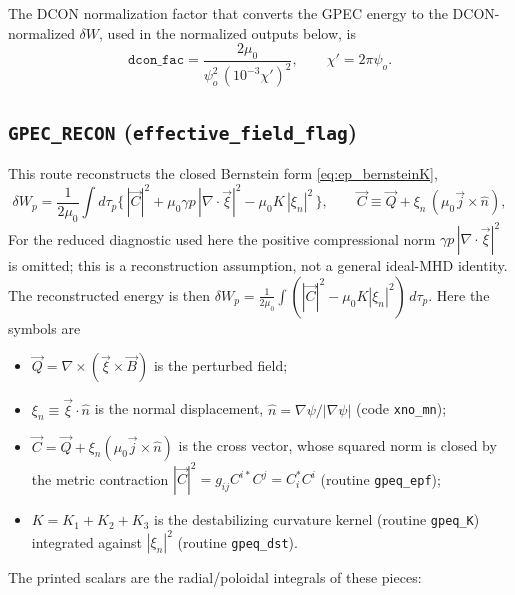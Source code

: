\documentclass[10pt,a4paper]{article}
\numberwithin{equation}{section}
\begin{document}
The DCON normalization factor that converts the GPEC energy to the
DCON-normalized $\delta W$, used in the normalized outputs below, is
\begin{equation}
\texttt{dcon\_fac}
=\frac{2\mu_0}{\psi_o^{2}\,(10^{-3}\chi')^{2}},
\qquad
\chi'=2\pi\psi_o .
\end{equation}

\subsection{\texttt{GPEC\_RECON} (\texttt{effective\_field\_flag})}

This route reconstructs the closed Bernstein form \eqref{eq:ep_bernsteinK},
\begin{equation}
\delta W_p=\frac{1}{2\mu_0}\int d\tau_p
\Big\{\,|\vec C|^2
+\mu_0\gamma p\,|\nabla\!\cdot\!\vec\xi|^2
-\mu_0 K\,|\xi_n|^2\,\Big\},
\qquad
\vec C\equiv\vec Q+\xi_n\,(\mu_0\vec j\times\hat n),
\label{eq:dWp_recon1}
\end{equation}
For the reduced diagnostic used here the positive compressional norm
\(\gamma p\,|\nabla\!\cdot\!\vec\xi|^2\) is omitted; this is a reconstruction
assumption, not a general ideal-MHD identity.  The reconstructed energy is then
\(\delta W_p=\tfrac{1}{2\mu_0}\int(|\vec C|^2-\mu_0K|\xi_n|^2)\,d\tau_p\).
Here the symbols are
\begin{itemize}
\item $\vec Q=\nabla\times(\vec\xi\times\vec B)$ is the perturbed field;
\item $\xi_n\equiv\vec\xi\cdot\hat n$ is the normal displacement, $\hat
  n=\nabla\psi/|\nabla\psi|$ (code \texttt{xno\_mn});
\item $\vec C=\vec Q+\xi_n(\mu_0\vec j\times\hat n)$ is the cross vector,
  whose squared norm is closed by the metric contraction
  $|\vec C|^2=g_{ij}C^{i*}C^{j}=C_i^*C^i$ (routine \texttt{gpeq\_epf});
\item $K=K_1+K_2+K_3$ is the destabilizing curvature kernel (routine
  \texttt{gpeq\_K}) integrated against $|\xi_n|^2$ (routine
  \texttt{gpeq\_dst}).
\end{itemize}
The printed scalars are the radial/poloidal integrals of these pieces:
\end{document}
